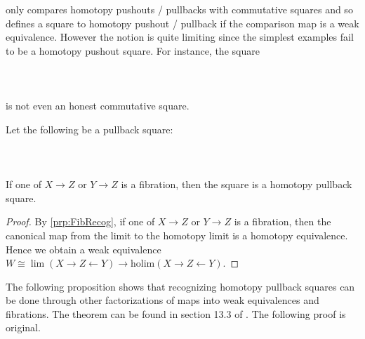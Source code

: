 \cite{CHT} only compares homotopy pushouts / pullbacks with commutative squares and so defines a square to homotopy pushout / pullback if the comparison map is a weak equivalence. However the notion is quite limiting since the simplest examples fail to be a homotopy pushout square. For instance, the square  
 \\~\\  \\~\\
is not even an honest commutative square. 

\begin{prp}\label{prp:FibRecogSq} Let the following be a pullback square:  
 \\~\\  \\~\\
If one of $X\to Z$ or $Y\to Z$ is a fibration, then the square is a homotopy pullback square. 
\begin{proof}
By \ref{prp:FibRecog}, if one of $X\to Z$ or $Y\to Z$ is a fibration, then the canonical map from the limit to the homotopy limit is a homotopy equivalence. Hence we obtain a weak equivalence $W\cong\lim(X\rightarrow Z\leftarrow Y)\to\text{holim}(X\rightarrow Z\leftarrow Y)$. 
\end{proof}
\end{prp}

The following proposition shows that recognizing homotopy pullback squares can be done through other factorizations of maps into weak equivalences and fibrations. The theorem can be found in section 13.3 of \cite{MCL}. The following proof is original. 

